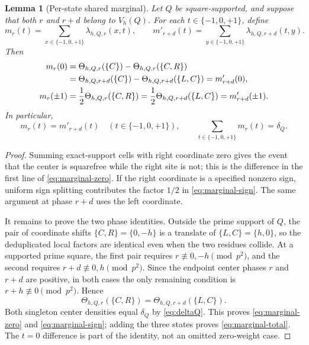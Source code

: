 \documentclass[11pt]{article}
\newtheorem{lemma}[theorem]{Lemma}
\theoremstyle{definition}
\theoremstyle{remark}
\newcommand{\T}{\{-1,0,+1\}}
\begin{document}
\begin{lemma}[Per-state shared marginal]
\label{lem:marginal}
Let \(Q\) be square-supported, and suppose that both \(r\) and \(r+d\)
belong to \(V_h(Q)\).  For each \(t\in\T\), define
\[
 m_r(t)=\sum_{x\in\T}\lambda_{h,Q,r}(x,t),\qquad
 m'_{r+d}(t)=\sum_{y\in\T}\lambda_{h,Q,r+d}(t,y).
\]
Then
\begin{align}
 m_r(0)
 &=\Theta_{h,Q,r}(\{C\})-\Theta_{h,Q,r}(\{C,R\})
 \notag\\
 &=\Theta_{h,Q,r+d}(\{C\})
   -\Theta_{h,Q,r+d}(\{L,C\})=m'_{r+d}(0),
 \label{eq:marginal-zero}\\
 m_r(\pm1)
 &=\frac12\Theta_{h,Q,r}(\{C,R\})
 =\frac12\Theta_{h,Q,r+d}(\{L,C\})
 =m'_{r+d}(\pm1).
 \label{eq:marginal-sign}
\end{align}
In particular,
\begin{equation}
 m_r(t)=m'_{r+d}(t)\quad(t\in\T),\qquad
 \sum_{t\in\T}m_r(t)=\delta_Q.
 \label{eq:marginal-total}
\end{equation}
\end{lemma}

\begin{proof}
Summing exact-support cells with right coordinate zero gives the event
that the center is squarefree while the right site is not; this is the
difference in the first line of \eqref{eq:marginal-zero}.  If the right
coordinate is a specified nonzero sign, uniform sign splitting contributes
the factor \(1/2\) in \eqref{eq:marginal-sign}.  The same argument at
phase \(r+d\) uses the left coordinate.

It remains to prove the two phase identities.  Outside the prime support
of \(Q\), the pair of coordinate shifts \(\{C,R\}=\{0,-h\}\) is a
translate of \(\{L,C\}=\{h,0\}\), so the deduplicated local factors are
identical even when the two residues collide.  At a supported prime
square, the first pair requires \(r\not\equiv0,-h\pmod{p^2}\), and the
second requires \(r+d\not\equiv0,h\pmod{p^2}\).  Since the endpoint center
phases \(r\) and \(r+d\) are positive, in both cases the only remaining
condition is \(r+h\not\equiv0\pmod{p^2}\).  Hence
\[
 \Theta_{h,Q,r}(\{C,R\})
 =\Theta_{h,Q,r+d}(\{L,C\}).
\]
Both singleton center densities equal \(\delta_Q\) by
\eqref{eq:deltaQ}.  This proves \eqref{eq:marginal-zero} and
\eqref{eq:marginal-sign}; adding the three states proves
\eqref{eq:marginal-total}.  The \(t=0\) difference is part of the
identity, not an omitted zero-weight case.
\end{proof}
\end{document}
